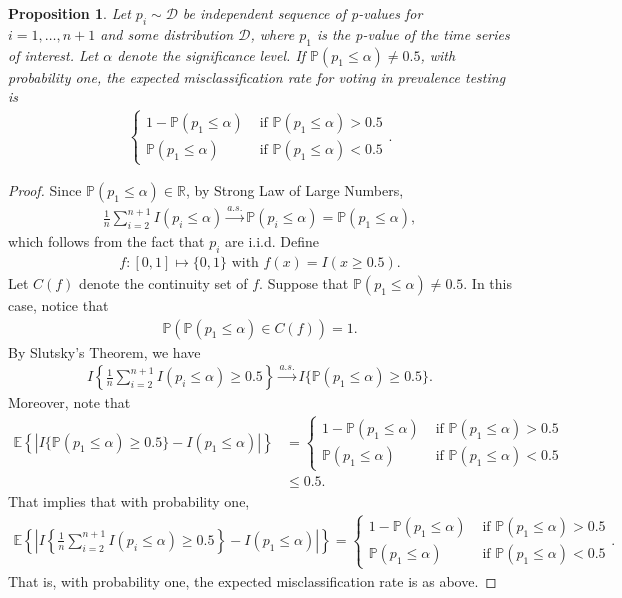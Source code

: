 \documentclass[11pt]{article}
\newcommand{\reals}{\mathbb{R}} %
\def\mc#1{\mathcal{#1}} %
\def\E{\mathbb{E}} %
\def\mc#1{\mathcal{#1}}
\def\P{\mathbb{P}}
\newtheorem{prop}{Proposition}
\theoremstyle{definition}
\begin{document}
\begin{prop}
  Let $p_i \sim \mc{D}$ be independent sequence of p-values for $i = 1, \ldots, n+1$ and some distribution $\mc{D}$, where $p_1$ is the p-value of the time series of interest. Let  $\alpha$ denote the significance level. If $\P(p_1 \leq \alpha) \neq 0.5$, with probability one, the expected misclassification rate for voting in prevalence testing is
  \begin{align*}
    \begin{cases}
    1- \P(p_1 \leq \alpha) & \text{ if } \P(p_1 \leq \alpha) > 0.5 \\
    \P(p_1 \leq \alpha) & \text{ if } \P(p_1 \leq \alpha) < 0.5 
  \end{cases} .
  \end{align*}
\end{prop}

\begin{proof}
 Since $\P(p_1 \leq \alpha)\in \reals$, by Strong Law of Large Numbers,
\begin{align*}
  \frac{1}{n}\sum_{i=2}^{n+1}I(p_i \leq  \alpha)  
   \stackrel{a.s.}{\rightarrow}  \P(p_i \leq \alpha) = \P(p_1 \leq \alpha),
\end{align*}
which follows from the fact that $p_i$ are i.i.d. Define
\begin{align*}
  f \colon [0,1] \mapsto \{0,1\} 
  \text{ with }
  f(x) = I(x \geq 0.5).
\end{align*}
Let $C(f)$ denote the continuity set of $f$. Suppose that $\P(p_1 \leq  \alpha) \neq 0.5$. In this case, notice that 
\begin{align*}
  \P(\P(p_1 \leq  \alpha) \in C(f)) =1.
\end{align*}
By Slutsky's Theorem, we have
\begin{align*}
  I\left\{\frac{1}{n}\sum_{i=2}^{n+1}I(p_i \leq  \alpha) \geq 0.5\right\}
  \stackrel{a.s.}{\rightarrow} 
  I\{ \P(p_1 \leq  \alpha) \geq 0.5\}.
\end{align*}
Moreover, note that
\begin{align*}
\E \left\{ |I\{ \P(p_1 \leq  \alpha) \geq 0.5\}
  - I( p_1 \leq  \alpha) |\right\}
  & = \begin{cases}
    1- \P(p_1 \leq \alpha) & \text{ if } \P(p_1 \leq \alpha) > 0.5 \\
    \P(p_1 \leq \alpha) & \text{ if } \P(p_1 \leq \alpha) < 0.5 
  \end{cases} \\
  & \leq  0.5.
\end{align*}
That implies that with probability one, 
\begin{align*}
  \E \left\{ \left|I\left\{\frac{1}{n}\sum_{i=2}^{n+1}I(p_i \leq  \alpha) \geq 0.5\right\}
  - I( p_1 \leq  \alpha) \right|\right\}
  = \begin{cases}
    1- \P(p_1 \leq \alpha) & \text{ if } \P(p_1 \leq \alpha) > 0.5 \\
    \P(p_1 \leq \alpha) & \text{ if } \P(p_1 \leq \alpha) < 0.5 
  \end{cases}.
\end{align*}
That is, with probability one, the expected misclassification rate is as above.
\end{proof}
\end{document}
